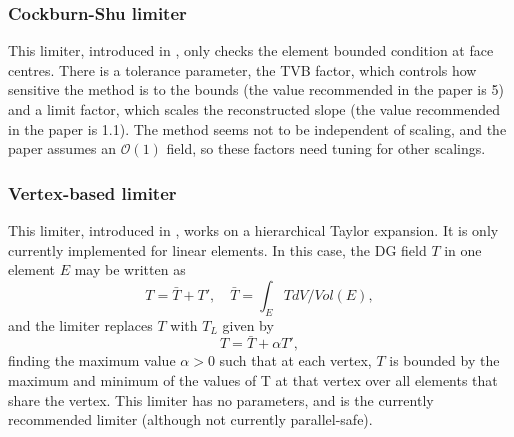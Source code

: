 \subsubsection{Cockburn-Shu limiter}
This limiter, introduced in \cite{CoSh2001}, only checks the element
bounded condition at face centres. There is a tolerance parameter, the
TVB factor, which controls how sensitive the method is to the bounds
(the value recommended in the paper is 5) and a limit factor, which
scales the reconstructed slope (the value recommended in the paper is
1.1). The method seems not to be independent of scaling, and the paper
assumes an $\mathcal{O}(1)$ field, so these factors need tuning for
other scalings.

\subsubsection{Vertex-based limiter}
This limiter, introduced in \cite{Ku2010}, works on a hierarchical
Taylor expansion. It is only currently implemented for linear elements.
In this case, the DG field $T$ in one element $E$ may be written as
\[
T = \bar{T} + T', \quad \bar{T} = \int_E T dV/Vol(E),
\]
and the limiter replaces $T$ with $T_L$ given by
\[
T = \bar{T} + \alpha T',
\]
finding the maximum value $\alpha>0$ such that at each vertex, $T$ is
bounded by the maximum and minimum of the values of T at that vertex
over all elements that share the vertex.  This limiter has no
parameters, and is the currently recommended limiter (although not
currently parallel-safe).

